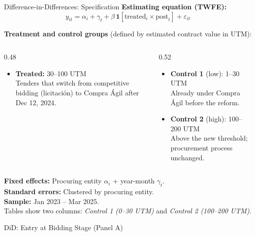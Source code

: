 \documentclass[10pt,aspectratio=169]{beamer}
\begin{document}
\begin{frame}{Difference-in-Differences: Specification}
\textbf{Estimating equation (TWFE):}
\[
  y_{it} = \alpha_i + \gamma_t + \beta\,\mathbf{1}[\text{treated}_i \times \text{post}_t] + \varepsilon_{it}
\]

\medskip
\textbf{Treatment and control groups} (defined by estimated contract value in UTM):
\begin{columns}[T]
\begin{column}{0.48\textwidth}
\begin{itemize}
  \item \textbf{Treated:} 30--100 UTM \\
        \small Tenders that switch from competitive bidding (licitaci\'on) to Compra \'Agil after Dec 12, 2024.
\end{itemize}
\end{column}
\begin{column}{0.52\textwidth}
\begin{itemize}
  \item \textbf{Control 1} (low): 1--30 UTM \\
        \small Already under Compra \'Agil before the reform.
  \item \textbf{Control 2} (high): 100--200 UTM \\
        \small Above the new threshold; procurement process unchanged.
\end{itemize}
\end{column}
\end{columns}

\medskip
\textbf{Fixed effects:} Procuring entity $\alpha_i$ + year-month $\gamma_t$.\\
\textbf{Standard errors:} Clustered by procuring entity.\\
\textbf{Sample:} Jan 2023 -- Mar 2025.\\[4pt]
\small Tables show two columns: \textit{Control 1 (0--30 UTM)} and \textit{Control 2 (100--200 UTM)}.
\end{frame}


\begin{frame}{DiD: Entry at Bidding Stage (Panel A)}
\small

\medskip

\end{frame}
\end{document}
